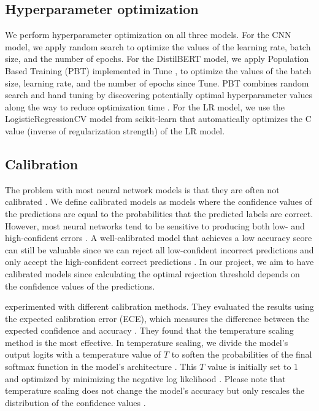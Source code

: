 \subsection{Hyperparameter optimization}
We perform hyperparameter optimization on all three models.
%
For the CNN model, we apply random search to optimize the values of the learning rate, batch size, and the number of epochs.
%
For the DistilBERT model, we apply Population Based Training (PBT) \citep{jaderberg2017population} implemented in Tune \citep{liaw2018tune}, to optimize the values of the batch size, learning rate, and the number of epochs since Tune.
%
PBT combines random search and hand tuning by discovering potentially optimal hyperparameter values along the way to reduce optimization time \citep{jaderberg2017population}.
%
For the LR model, we use the LogisticRegressionCV model from scikit-learn that automatically optimizes the C value (inverse of regularization strength) of the LR model.

\subsection{Calibration}
The problem with most neural network models is that they are often not calibrated \citep{guo2017calibration,sayin2021science}.
%
We define calibrated models as models where the confidence values of the predictions are equal to the probabilities that the predicted labels are correct.
%
However, most neural networks tend to be sensitive to producing both low- and high-confident errors \citep{guo2017calibration, sayin2021science}.
%
A well-calibrated model that achieves a low accuracy score can still be valuable since we can reject all low-confident incorrect predictions and only accept the high-confident correct predictions \citep{sayin2021science}.
%
In our project, we aim to have calibrated models since calculating the optimal rejection threshold depends on the confidence values of the predictions.
%

%
\citet{guo2017calibration} experimented with different calibration methods.
%
They evaluated the results using the expected calibration error (ECE), which measures the difference between the expected confidence and accuracy \citep{guo2017calibration}.
%
They found that the temperature scaling method is the most effective.
%
In temperature scaling, we divide the model's output logits with a temperature value of $T$ to soften the probabilities of the final softmax function in the model's architecture \citep{guo2017calibration}.
%
This $T$ value is initially set to $1$ and optimized by minimizing the negative log likelihood \citep{guo2017calibration}.
%
Please note that temperature scaling does not change the model's accuracy but only rescales the distribution of the confidence values \citep{guo2017calibration}.
%

